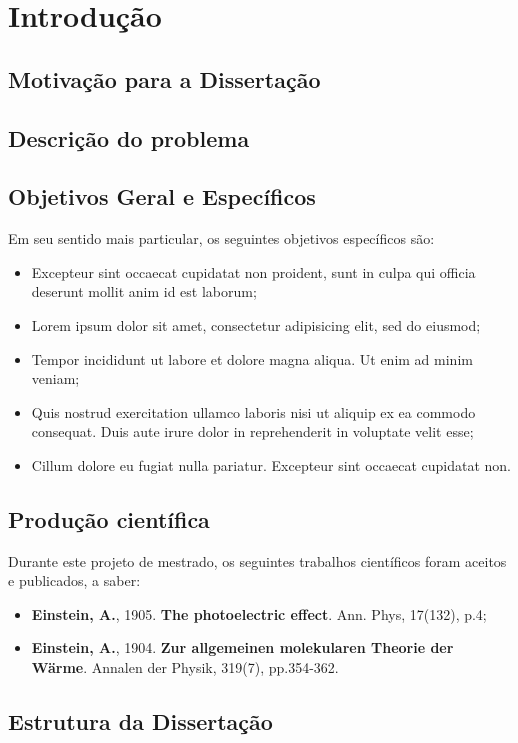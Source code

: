 \chapter{Introdução}\label{cap:introducao}
\lipsum[1]

\section{Motivação para a Dissertação}\label{sec:motivacao}
\lipsum[1]

\section{Descrição do problema}\label{sec:descricao-problema}
\lipsum[1]

\section{Objetivos Geral e Específicos}\label{sec:objetivos}
\lipsum[1]

Em seu sentido mais particular, os seguintes objetivos específicos são:

\begin{itemize}
	\item Excepteur sint occaecat cupidatat non proident, sunt in culpa qui officia deserunt mollit anim id est laborum;
	\item Lorem ipsum dolor sit amet, consectetur adipisicing elit, sed do eiusmod;
	\item Tempor incididunt ut labore et dolore magna aliqua. Ut enim ad minim veniam;
	\item Quis nostrud exercitation ullamco laboris nisi ut aliquip ex ea commodo consequat. Duis aute irure dolor in reprehenderit in voluptate velit esse;
	\item Cillum dolore eu fugiat nulla pariatur. Excepteur sint occaecat cupidatat non.
\end{itemize}

\section{Produção científica}\label{sec:producao}
Durante este projeto de mestrado, os seguintes trabalhos científicos foram aceitos e publicados, a saber:

\begin{itemize}
	\item \textbf{Einstein, A.}, 1905. \textbf{The photoelectric effect}. Ann. Phys, 17(132), p.4;
	\item \textbf{Einstein, A.}, 1904. \textbf{Zur allgemeinen molekularen Theorie der Wärme}. Annalen der Physik, 319(7), pp.354-362.
\end{itemize}

\section{Estrutura da Dissertação}\label{sec:estrutura}
\lipsum[1]
